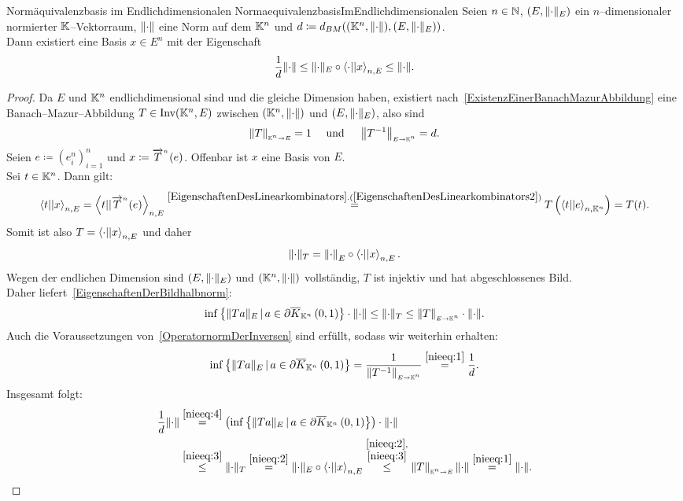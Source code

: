 \begin{korollar}{Normäquivalenzbasis im Endlichdimensionalen}
                {NormaequivalenzbasisImEndlichdimensionalen}
Seien $n \in \mathbb{N}$, $(E, \lVert\cdot\rVert_E)$ ein $n$--dimensionaler normierter
$\mathbb{K}$--Vektorraum, $\lVert\cdot\rVert$ eine Norm auf dem $\mathbb{K}^n$ und 
$d \coloneqq  d_{BM}((\mathbb{K}^n, \lVert\cdot\rVert), (E, \lVert\cdot\rVert_E))$.\\
Dann existiert eine Basis $x \in E^n$ mit der Eigenschaft
\[\frac 1 d \lVert\cdot\rVert \le\lVert\cdot\rVert_E \circ \left\langle \cdot ||x\right\rangle_{n, E} \le \lVert\cdot\rVert\text.\]
\end{korollar}
\begin{proof}
Da $E$ und $\mathbb{K}^n$ endlichdimensional sind und die gleiche Dimension haben,
existiert nach~\ref{ExistenzEinerBanachMazurAbbildung} eine
Banach--Mazur--Abbildung 
$T \in \mathop{\textrm{Inv}}\nolimits(\mathbb{K}^n, E)$ zwischen $(\mathbb{K}^n, \lVert\cdot\rVert)$ und $(E, \lVert\cdot\rVert_E)$,
also sind 
\begin{align}\left\|T\right\|_{\scriptscriptstyle{\ensuremath{\mathbb{K}}^n \rightarrow E}}=1 \quad \text{ und }\quad 
\left\|T ^{-1}\right\|_{\scriptscriptstyle{E \rightarrow \ensuremath{\mathbb{K}}^n}} = d\text. \label{nieeq:1}\end{align}
Seien $e \coloneqq  (e_i^n)_{i=1}^n$ und $x \coloneqq  {\overrightarrow{T}}^{{}_n} (e)$. Offenbar ist $x$ eine Basis von $E$.\\
Sei $t \in \mathbb{K}^n$. Dann gilt:
\[ \bprod t x _{n, E}= \bprod t {\pfeil T n (e)} _{n, E}
\overset{\refclaim{EigenschaftenDesLinearkombinators}
{EigenschaftenDesLinearkombinators2}}{=} 
T\left(\bprod t e _{n, \K^n}\right) = T(t)\text.\]
Somit ist also $T = \left\langle \cdot ||x\right\rangle_{n, E}$ und daher 
\begin{align}\lVert\cdot\rVert_T = \left\|\cdot\right\|_E \circ \left\langle \cdot ||x\right\rangle _{n, E}\text.
\label{nieeq:2}\end{align}
Wegen der endlichen Dimension sind $(E, \lVert\cdot\rVert_E)$ und $(\mathbb{K}^n, \lVert\cdot\rVert)$
vollständig, $T$ ist injektiv und hat abgeschlossenes Bild.\\
Daher liefert~\ref{EigenschaftenDerBildhalbnorm}:
\begin{align}\inf\left\{ \lVert Ta\rVert_E \,|\,a \in \partial \overline K_{\mathbb{K}^n}\left(0, 1\right)\right\} \cdot \lVert\cdot\rVert
    \le \lVert\cdot\rVert_T \le \left\|T\right\|_{\scriptscriptstyle{E \rightarrow \ensuremath{\mathbb{K}}^n}}\cdot \lVert\cdot\rVert\text. \label{nieeq:3}
    \end{align}
Auch die Voraussetzungen von~\ref{OperatornormDerInversen} sind erfüllt,
sodass wir weiterhin erhalten:
\begin{align}\label{nieeq:4}\inf\left\{ \lVert Ta\rVert_E \,|\,a \in \partial \overline K_{\mathbb{K}^n}\left(0, 1\right)\right\} 
 = \frac 1 {\left\|T^{-1}\right\|_{\scriptscriptstyle{E \rightarrow \ensuremath{\mathbb{K}}^n}}} \overset{\eqref{nieeq:1}}= \frac 1 d\text. \end{align}
Insgesamt folgt:
\begin{align*}
\frac 1 d \lVert\cdot\rVert &\overset{\eqref{nieeq:4}}=
 \left(\inf\left\{\lVert Ta\rVert_E \,|\,a\in\partial \overline K_{\mathbb{K}^n}\left(0, 1\right)\right\}\right) \cdot \lVert\cdot\rVert \\
 &\overset{\eqref{nieeq:3}}\le \lVert\cdot\rVert_T \overset{\eqref{nieeq:2}}= 
 \lVert\cdot\rVert_E \circ \left\langle \cdot ||x\right\rangle _{n, E}
 \overset{\substack{\eqref{nieeq:2},\\\eqref{nieeq:3}}}\le 
 \left\|T\right\|_{\scriptscriptstyle{\ensuremath{\mathbb{K}}^n \rightarrow E}} \lVert\cdot\rVert \overset{\eqref{nieeq:1}}
 = \lVert\cdot\rVert \text.
\end{align*}
\end{proof}